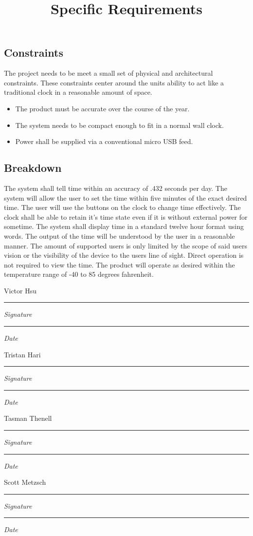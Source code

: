 \documentclass[10pt,draftclsnofoot,onecolumn]{IEEEtran}
\newcommand{\namesigdate}[2][7cm]{%
\begin{minipage}{#1}
    #2 \vspace{1.0cm}\hrule\smallskip
    \small \textit{Signature}
    \vspace{1.0cm}\hrule\smallskip
    \small \textit{Date}
\end{minipage}
}
\begin{document}
\subsection{Constraints}
The project needs to be meet a small set of physical and architectural constraints. These
constraints center around the units ability to act like a traditional clock in a reasonable
amount of space.
\begin{itemize}
	\item The product must be accurate over the course of the year.
	\item The system needs to be compact enough to fit in a normal wall clock.
	\item Power shall be supplied via a conventional micro USB feed.
\end{itemize}

\newpage
\title{Specific Requirements}
\subsection{Breakdown}
The system shall tell time within an accuracy of .432 seconds per day. The system will allow
the user to set the time within five minutes of the exact desired time. The user will use the
buttons on the clock to change time effectively. The clock shall be able to retain it’s time
state even if it is without external power for sometime. The system shall display time in a
standard twelve hour format using words. The output of the time will be understood by the user
in a reasonable manner. The amount of supported users is only limited by the scope of said
users vision or the visibility of the device to the users line of sight. Direct operation is
not required to view the time. The product will operate as desired within the temperature
range of -40 to 85 degrees fahrenheit.

\newpage

\noindent \namesigdate{Victor Hsu} \hfill \namesigdate{Tristan Hari} \par
\vspace{2cm}
\noindent \namesigdate{Tasman Thenell} \hfill \namesigdate{Scott Metzsch}
\end{document}
